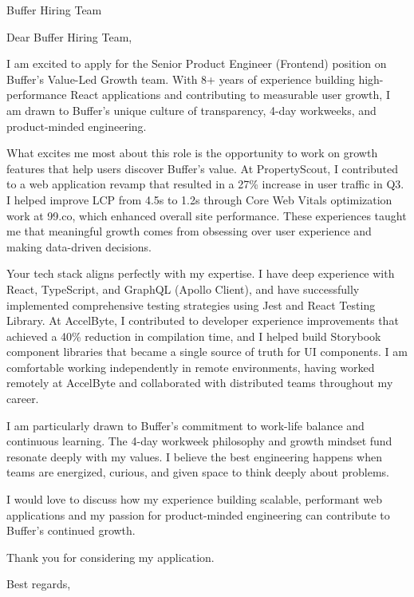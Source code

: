 \documentclass[11pt,a4paper]{letter}
\begin{document}
\begin{letter}{Buffer Hiring Team}

\opening{Dear Buffer Hiring Team,}

I am excited to apply for the Senior Product Engineer (Frontend) position on Buffer's Value-Led Growth team. With 8+ years of experience building high-performance React applications and contributing to measurable user growth, I am drawn to Buffer's unique culture of transparency, 4-day workweeks, and product-minded engineering.

What excites me most about this role is the opportunity to work on growth features that help users discover Buffer's value. At PropertyScout, I contributed to a web application revamp that resulted in a 27\% increase in user traffic in Q3. I helped improve LCP from 4.5s to 1.2s through Core Web Vitals optimization work at 99.co, which enhanced overall site performance. These experiences taught me that meaningful growth comes from obsessing over user experience and making data-driven decisions.

Your tech stack aligns perfectly with my expertise. I have deep experience with React, TypeScript, and GraphQL (Apollo Client), and have successfully implemented comprehensive testing strategies using Jest and React Testing Library. At AccelByte, I contributed to developer experience improvements that achieved a 40\% reduction in compilation time, and I helped build Storybook component libraries that became a single source of truth for UI components. I am comfortable working independently in remote environments, having worked remotely at AccelByte and collaborated with distributed teams throughout my career.

I am particularly drawn to Buffer's commitment to work-life balance and continuous learning. The 4-day workweek philosophy and growth mindset fund resonate deeply with my values. I believe the best engineering happens when teams are energized, curious, and given space to think deeply about problems.

I would love to discuss how my experience building scalable, performant web applications and my passion for product-minded engineering can contribute to Buffer's continued growth.

Thank you for considering my application.

\closing{Best regards,}

\end{letter}
\end{document}

